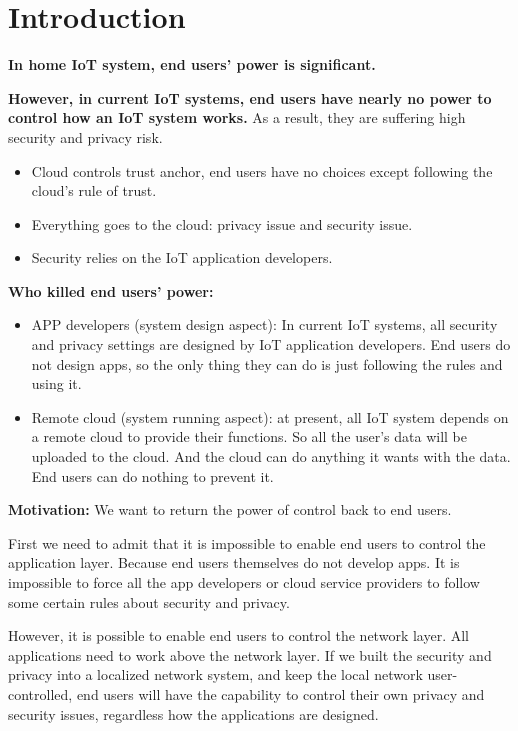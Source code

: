 \section{Introduction}
\textbf{In home IoT system, end users' power is significant.}

\textbf{However, in current IoT systems, end users have nearly no power to control how an IoT system works.} 
As a result, they are suffering high security and privacy risk.
\begin{itemize}
	\item Cloud controls trust anchor, end users have no choices except following the cloud's rule of trust. 
	\item Everything goes to the cloud: privacy issue and security issue.
	\item Security relies on the IoT application developers.
\end{itemize}

\textbf{Who killed end users' power: }
\begin{itemize}
	\item APP developers (system design aspect): In current IoT systems, all security and privacy settings are designed by IoT application developers. End users do not design apps, so the only thing they can do is just following the rules and using it.
	\item Remote cloud (system running aspect): at present, all IoT system depends on a remote cloud to provide their functions. So all the user's data will be uploaded to the cloud. And the cloud can do anything it wants with the data. End users can do nothing to prevent it.
\end{itemize}

\textbf{Motivation:} We want to return the power of control back to end users.

First we need to admit that it is impossible to enable end users to control the application layer. Because end users themselves do not develop apps. It is impossible to force all the app developers or cloud service providers to follow some certain rules about security and privacy.

However, it is possible to enable end users to control the network layer. All applications need to work above the network layer. If we built the security and privacy into a localized network system, and keep the local network user-controlled, end users will have the capability to control their own privacy and security issues, regardless how the applications are designed.

